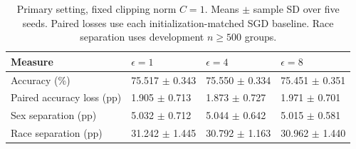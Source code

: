\begin{table}[t]
\centering
\small
\setlength{\tabcolsep}{3pt}
\begin{tabular}{llll}
\toprule
Measure & $\epsilon=1$ & $\epsilon=4$ & $\epsilon=8$ \\
\midrule
Accuracy (\%) & 75.517 $\pm$ 0.343 & 75.550 $\pm$ 0.334 & 75.451 $\pm$ 0.351 \\
Paired accuracy loss (pp) & 1.905 $\pm$ 0.713 & 1.873 $\pm$ 0.727 & 1.971 $\pm$ 0.701 \\
Sex separation (pp) & 5.032 $\pm$ 0.712 & 5.044 $\pm$ 0.642 & 5.015 $\pm$ 0.581 \\
Race separation (pp) & 31.242 $\pm$ 1.445 & 30.792 $\pm$ 1.163 & 30.962 $\pm$ 1.440 \\
\bottomrule
\end{tabular}
\caption{Primary setting, fixed clipping norm $C=1$. Means $\pm$ sample SD over five seeds. Paired losses use each initialization-matched SGD baseline. Race separation uses development $n\geq500$ groups.}
\label{tab:budgets}
\end{table}
